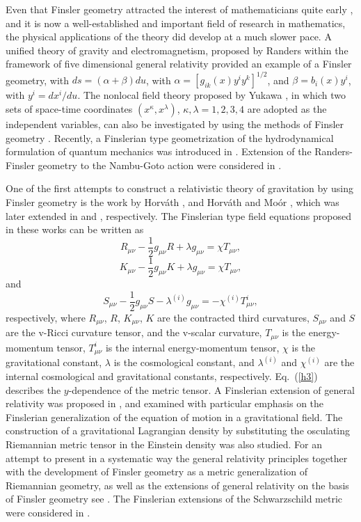 \documentclass[aps,superscriptaddress, showpacs,preprintnumbers, superscriptaddress, nofootinbibt,twocolumn]{revtex4-2}
\def\be{\begin{equation}}
\def\ee{\end{equation}}
\begin{document}
Even that Finsler geometry attracted the interest of mathematicians quite early \cite{F3,F4,F5}, and it is now a well-established and important field of research in mathematics, the physical applications of the theory did develop at a much slower pace. A unified theory of gravity and electromagnetism, proposed by Randers \cite{Rand} within the framework of five dimensional general relativity provided an example of a Finsler geometry, with $ds=\left(\alpha +\beta\right)du$, with $\alpha =\left[g_{ik}(x)y^iy^k\right]^{1/2}$, and $\beta =b_i(x)y^i$, with $y^i=dx^i/du$. The nonlocal field theory proposed by Yukawa \cite{Yuk1,Yuk2}, in which two sets of space-time coordinates
$\left(x^{\kappa}, x^{\lambda}\right)$, $\kappa, \lambda  = 1,2,3,4$ are adopted as the independent variables, can also be investigated by using the methods of Finsler geometry \cite{Hor,Tak, Ik1}.  Recently, a Finslerian type geometrization of the hydrodynamical formulation of quantum mechanics was introduced in \cite{Quant}.  Extension of the Randers-Finsler geometry  to the Nambu-Goto action were considered in \cite{string}.

One of the first attempts to construct a relativistic theory of gravitation by using Finsler geometry is the work by Horv\'{a}th \cite {Hor1}, and Horv\'{a}th  and Mo\'{o}r \cite{Hor2}, which was later extended in \cite{Tak1} and \cite{Tak2}, respectively. The Finslerian type field equations proposed in these works can be written as
\be\label{h1}
R_{\mu \nu}-\frac{1}{2}g_{\mu \nu}R+\lambda g_{\mu \nu}=\chi T_{\mu \nu},
\ee
\be\label{h2}
K_{\mu \nu}-\frac{1}{2}g_{\mu \nu}K+\lambda g_{\mu \nu}=\chi T_{\mu \nu},
\ee
and
\be\label{h3}
S_{\mu \nu}-\frac{1}{2}g_{\mu \nu}S-\lambda^{(i)} g_{\mu \nu}=-\chi ^{(i)}T_{\mu \nu}^{i},
\ee
respectively, where $R_{\mu \nu}$, $R$, $K_{\mu \nu}$, $K$ are the contracted third curvatures, $S_{\mu \nu}$ and $S$ are the v-Ricci curvature tensor, and the v-scalar curvature, $T_{\mu \nu}$ is the energy-momentum
tensor, $T_{\mu \nu}^{i}$ is the internal energy-momentum
tensor, $\chi$ is the gravitational constant, $\lambda$ is the cosmological constant, and $\lambda ^{(i)}$ and $\chi ^{(i)}$ are the internal cosmological and gravitational constants, respectively. Eq.~(\ref{h3}) describes the $y$-dependence of the metric tensor. A Finslerian extension of general relativity was proposed in \cite{As0},  and examined with particular emphasis on the Finslerian generalization of the equation of motion in a gravitational field. The construction of a gravitational Lagrangian density by substituting the osculating Riemannian metric tensor in the Einstein density was also studied.  For an attempt to present in a systematic way the general relativity principles together with the development of Finsler geometry as a metric generalization of Riemannian geometry, as well as the extensions of general relativity on the basis of Finsler geometry see \cite{As1}. The Finslerian extensions of the Schwarzschild metric were considered in \cite{As2,As3}.
\end{document}
